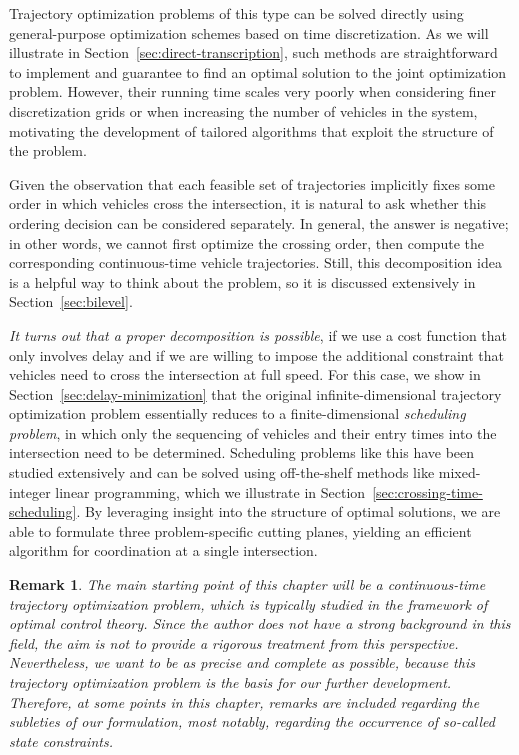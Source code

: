\documentclass[a4paper]{report}
\theoremstyle{definition}
\theoremstyle{plain}
\newtheorem{remark}{Remark}[chapter]
\begin{document}
Trajectory optimization problems of this type can be solved directly using
general-purpose optimization schemes based on time discretization.
%
As we will illustrate in Section~\ref{sec:direct-transcription}, such methods
are straightforward to implement and guarantee to find an optimal solution to
the joint optimization problem. However, their running time scales very poorly
when considering finer discretization grids or when increasing the number of
vehicles in the system, motivating the development of tailored algorithms that
exploit the structure of the problem.

Given the observation that each feasible set of trajectories implicitly fixes
some order in which vehicles cross the intersection, it is natural to ask
whether this ordering decision can be considered separately.
%
In general, the answer is negative; in other words, we cannot first optimize the
crossing order, then compute the corresponding continuous-time vehicle
trajectories.
%
Still, this decomposition idea is a helpful way to think about the problem, so
it is discussed extensively in Section~\ref{sec:bilevel}.

\emph{It turns out that a proper decomposition is possible}, if we use a cost
function that only involves delay and if we are willing to impose the additional
constraint that vehicles need to cross the intersection at full speed. For this
case, we show in Section~\ref{sec:delay-minimization} that the original
infinite-dimensional trajectory optimization problem essentially reduces to a
finite-dimensional \emph{scheduling problem}, in which only the sequencing of
vehicles and their entry times into the intersection need to be determined.
%
Scheduling problems like this have been studied extensively and can be solved
using off-the-shelf methods like mixed-integer linear programming, which we
illustrate in Section~\ref{sec:crossing-time-scheduling}.
%
By leveraging insight into the structure of optimal solutions, we are able to
formulate three problem-specific cutting planes, yielding an efficient
algorithm for coordination at a single intersection.

\begin{remark}
  The main starting point of this chapter will be a continuous-time trajectory
  optimization problem, which is typically studied in the framework of optimal
  control theory. Since the author does not have a strong background in this
  field, the aim is not to provide a rigorous treatment from this perspective.
  Nevertheless, we want to be as precise and complete as possible, because this
  trajectory optimization problem is the basis for our further development.
  Therefore, at some points in this chapter, remarks are included regarding the
  subleties of our formulation, most notably, regarding the occurrence of
  so-called state constraints.
\end{remark}
\end{document}
